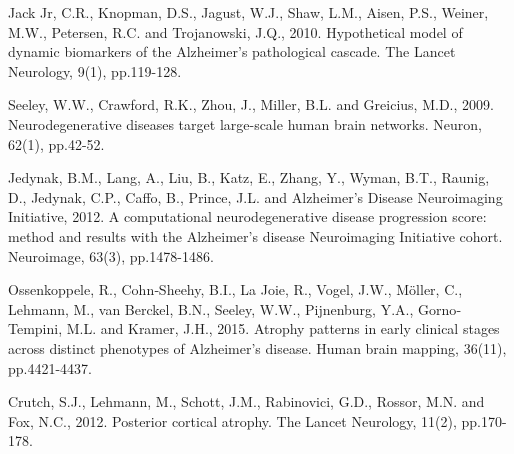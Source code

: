 \documentclass{llncs}
\begin{document}
\begin{thebibliography}{5}
Jack Jr, C.R., Knopman, D.S., Jagust, W.J., Shaw, L.M., Aisen, P.S., Weiner, M.W., Petersen, R.C. and Trojanowski, J.Q., 2010. Hypothetical model of dynamic biomarkers of the Alzheimer's pathological cascade. The Lancet Neurology, 9(1), pp.119-128.

Seeley, W.W., Crawford, R.K., Zhou, J., Miller, B.L. and Greicius, M.D., 2009. Neurodegenerative diseases target large-scale human brain networks. Neuron, 62(1), pp.42-52.

Jedynak, B.M., Lang, A., Liu, B., Katz, E., Zhang, Y., Wyman, B.T., Raunig, D., Jedynak, C.P., Caffo, B., Prince, J.L. and Alzheimer's Disease Neuroimaging Initiative, 2012. A computational neurodegenerative disease progression score: method and results with the Alzheimer's disease Neuroimaging Initiative cohort. Neuroimage, 63(3), pp.1478-1486.

Ossenkoppele, R., Cohn‐Sheehy, B.I., La Joie, R., Vogel, J.W., Möller, C., Lehmann, M., van Berckel, B.N., Seeley, W.W., Pijnenburg, Y.A., Gorno‐Tempini, M.L. and Kramer, J.H., 2015. Atrophy patterns in early clinical stages across distinct phenotypes of Alzheimer's disease. Human brain mapping, 36(11), pp.4421-4437.

Crutch, S.J., Lehmann, M., Schott, J.M., Rabinovici, G.D., Rossor, M.N. and Fox, N.C., 2012. Posterior cortical atrophy. The Lancet Neurology, 11(2), pp.170-178.


\end{thebibliography}

\clearpage
\end{document}
